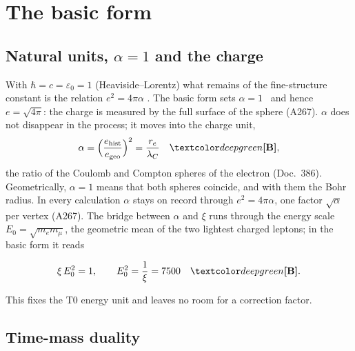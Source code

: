 \section{The basic form}

\subsection{Natural units, \texorpdfstring{$\alpha=1$}{alpha = 1} and the charge}

With $\hbar=c=\varepsilon_0=1$ (Heaviside--Lorentz) what remains of the fine-structure constant
is the relation $e^2=4\pi\alpha$ \BM. The basic form sets $\alpha=1$ \QM\ and hence
$e=\sqrt{4\pi}$: the charge is measured by the full surface of the sphere (A267). $\alpha$ does
not disappear in the process; it moves into the charge unit,
\begin{equation}
  \alpha=\Bigl(\frac{e_{\text{hist}}}{e_{\text{geo}}}\Bigr)^2=\frac{r_e}{\lambda_C}\quad\BM ,
\end{equation}
the ratio of the Coulomb and Compton spheres of the electron (Doc.~386). Geometrically,
$\alpha=1$ means that both spheres coincide, and with them the Bohr radius. In every calculation
$\alpha$ stays on record through $e^2=4\pi\alpha$, one factor $\sqrt\alpha$ per vertex (A267). The
bridge between $\alpha$ and $\xi$ runs through the energy scale $E_0=\sqrt{m_em_\mu}$, the
geometric mean of the two lightest charged leptons; in the basic form it reads
\begin{ffkern}
\begin{equation}
  \xi\,E_0^2=1,\qquad E_0^2=\frac1\xi=7500\quad\BM .
\end{equation}
\end{ffkern}%
This fixes the T0 energy unit and leaves no room for a correction factor.

\subsection{Time-mass duality}

